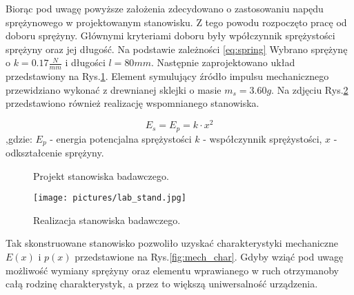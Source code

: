 \indent %
Biorąc pod uwagę powyższe założenia zdecydowano o zastosowaniu napędu sprężynowego w projektowanym stanowisku. Z tego powodu rozpoczęto pracę od doboru sprężyny. Głównymi kryteriami doboru były wpółczynnik sprężystości sprężyny oraz jej długość. Na podstawie zależności \ref{eq:spring} Wybrano sprężynę o $k=0.17\frac{N}{mm}$ i długości $l=80mm$. Następnie zaprojektowano
układ przedstawiony na Rys.\ref{fig:test_stand}. Element symulujący źródło impulsu mechanicznego przewidziano wykonać z drewnianej sklejki o masie $m_s = 3.60g$. Na zdjęciu Rys.\ref{fig:test_stand_photo} przedstawiono również realizację wspomnianego stanowiska.

\begin{equation}
E_s = E_p = k \cdot x^2
\label{eq:spring}
\end{equation}
,gdzie: $E_p$ - energia potencjalna sprężystości $k$ - współczynnik sprężystości, $x$ - odkształcenie sprężyny.


\begin{figure}[htbp]
\centering
{}%
\caption{Projekt stanowiska badawczego.}
\label{fig:test_stand}
\end{figure}

\begin{figure}[htbp]
\centering
\texttt{[image: pictures/lab\_stand.jpg]}
\caption{Realizacja stanowiska badawczego.}
\label{fig:test_stand_photo}
\end{figure}

Tak skonstruowane stanowisko pozwoliło uzyskać charakterystyki mechaniczne $E(x)$ i $p(x)$ przedstawione na Rys.\ref{fig:mech_char}. Gdyby wziąć pod uwagę możliwość wymiany sprężyny oraz elementu wprawianego w ruch otrzymanoby całą rodzinę charakterystyk, a przez to większą uniwersalność urządzenia.

\pgfplotsset{width=\linewidth,compat=1.3}



